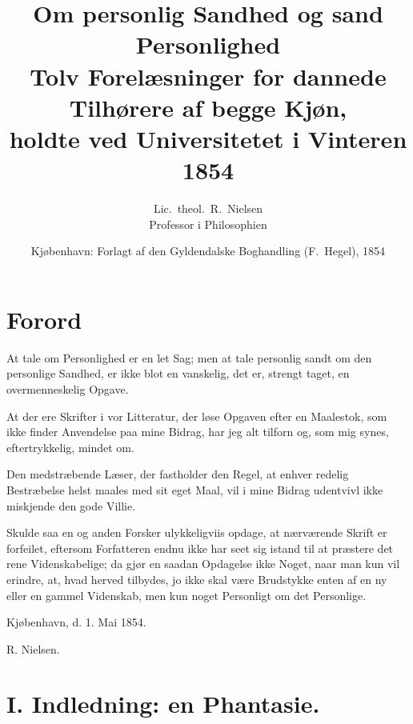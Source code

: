 \documentclass[12pt,a4paper]{book}
\title{\textbf{Om personlig Sandhed og sand Personlighed}\\[6pt]
  \large Tolv Forelæsninger for dannede Tilhørere af begge Kjøn,\\
  holdte ved Universitetet i Vinteren 1854}
\author{Lic.\ theol.\ R.\ Nielsen\\\normalsize Professor i Philosophien}
\date{Kjøbenhavn: Forlagt af den Gyldendalske Boghandling (F.\ Hegel), 1854}
\newcommand{\apage}[1]{\marginnote{\footnotesize\textit{[#1]}}}
\begin{document}
\maketitle
\thispagestyle{empty}
\newpage

\tableofcontents
\newpage

\chapter*{Forord}
\label{ch:forord}

At tale om Personlighed er en let Sag; men at tale personlig sandt om den personlige Sandhed, er ikke blot en vanskelig, det er, strengt taget, en overmenneskelig Opgave.

At der ere Skrifter i vor Litteratur, der løse Opgaven efter en Maalestok, som ikke finder Anvendelse paa mine Bidrag, har jeg alt tilforn og, som mig synes, eftertrykkelig, mindet om.

Den medstræbende Læser, der fastholder den Regel, at enhver redelig Bestræbelse helst maales med sit eget Maal, vil i mine Bidrag udentvivl ikke miskjende den gode Villie.

Skulde saa en og anden Forsker ulykkeligviis opdage, at nærværende Skrift er forfeilet, eftersom Forfatteren endnu ikke har seet sig istand til at præstere det rene Videnskabelige; da gjør en saadan Opdagelse ikke Noget, naar man kun vil erindre, at, hvad herved tilbydes, jo ikke skal være Brudstykke enten af en ny eller en gammel Videnskab, men kun noget Personligt om det Personlige.

\begin{flushright}
Kjøbenhavn, d. 1. Mai 1854.

R. Nielsen.
\end{flushright}

\chapter*{I. Indledning: en Phantasie.}
\label{ch:forel1}
 \apage{1}
\end{document}
